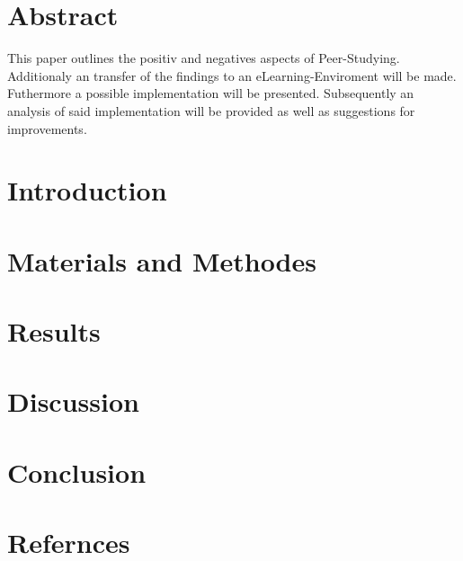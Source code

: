 \documentclass[12pt, a4paper]{article}
\begin{document}
    \tableofcontents

\section{Abstract}
This paper outlines the positiv and negatives aspects of Peer-Studying.
Additionaly an transfer of the findings to an eLearning-Enviroment will be made. 
Futhermore a possible implementation will be presented.
Subsequently an analysis of said implementation  will be provided as well as suggestions
for improvements.

\section{Introduction}
\section{Materials and Methodes}
\section{Results}
\section{Discussion}
\section{Conclusion}
\section{Refernces}
\end{document}

